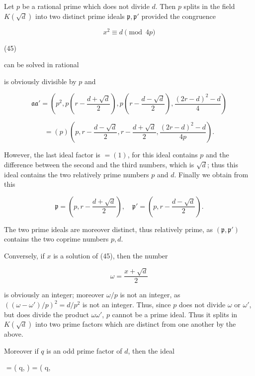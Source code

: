 Let $p$ be a rational prime which does not divide $d$. Then $p$ splits in the field $K(\sqrt{d})$ into two distinct prime ideals $\mathfrak{p}, \mathfrak{p}'$ provided the congruence

$$x^2 \equiv d \pmod{4p}$$

(45)

can be solved in rational

is obviously divisible by $p$ and

$$\mathfrak{a}\mathfrak{a}' = \left( p^2, p \left( r - \frac{d + \sqrt{d}}{2} \right), p \left( r - \frac{d - \sqrt{d}}{2} \right), \frac{(2r - d)^2 - d}{4} \right)$$

$$= (p) \left( p, r - \frac{d - \sqrt{d}}{2}, r - \frac{d + \sqrt{d}}{2}, \frac{(2r - d)^2 - d}{4p} \right).$$

However, the last ideal factor is $= (1)$, for this ideal contains $p$ and the difference between the second and the third numbers, which is $\sqrt{d}$; thus this ideal contains the two relatively prime numbers $p$ and $d$. Finally we obtain from this

$$\mathfrak{p} = \left( p, r - \frac{d + \sqrt{d}}{2} \right), \quad \mathfrak{p}' = \left( p, r - \frac{d - \sqrt{d}}{2} \right).$$

The two prime ideals are moreover distinct, thus relatively prime, as $(\mathfrak{p}, \mathfrak{p}')$ contains the two coprime numbers $p, d$.

Conversely, if $x$ is a solution of (45), then the number

$$\omega = \frac{x + \sqrt{d}}{2}$$

is obviously an integer; moreover $\omega/p$ is not an integer, as $((\omega - \omega')/p)^2 = d/p^2$ is not an integer. Thus, since $p$ does not divide $\omega$ or $\omega'$, but does divide the product $\omega \omega'$, $p$ cannot be a prime ideal. Thus it splits in $K(\sqrt{d})$ into two prime factors which are distinct from one another by the above.

Moreover if $q$ is an odd prime factor of $d$, then the ideal

$$ = \left( q,  \right) = \left( q, 

